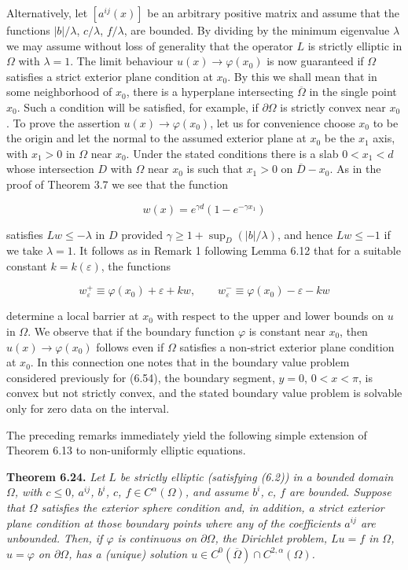 Alternatively, let $[a^{ij}(x)]$ be an arbitrary positive matrix and assume that the functions $\lvert b\rvert/\lambda$, $c/\lambda$, $f/\lambda$, are bounded. By dividing by the minimum eigenvalue $\lambda$ we may assume without loss of generality that the operator $L$ is strictly elliptic in $\Omega$ with $\lambda=1$. The limit behaviour $u(x)\to \varphi(x_0)$ is now guaranteed if $\Omega$ satisfies a strict exterior plane condition at $x_0$. By this we shall mean that in some neighborhood of $x_0$, there is a hyperplane intersecting $\overline{\Omega}$ in the single point $x_0$. Such a condition will be satisfied, for example, if $\partial\Omega$ is strictly convex near $x_0$. To prove the assertion $u(x)\to \varphi(x_0)$, let us for convenience choose $x_0$ to be the origin and let the normal to the assumed exterior plane at $x_0$ be the $x_1$ axis, with $x_1>0$ in $\Omega$ near $x_0$. Under the stated conditions there is a slab $0<x_1<d$ whose intersection $D$ with $\Omega$ near $x_0$ is such that $x_1>0$ on $\overline{D}-x_0$. As in the proof of Theorem 3.7 we see that the function

\[
w(x)=e^{\gamma d}(1-e^{-\gamma x_1})
\]

satisfies $Lw\le -\lambda$ in $D$ provided $\gamma\ge 1+\sup_D(\lvert b\rvert/\lambda)$, and hence $Lw\le -1$ if we take $\lambda=1$. It follows as in Remark 1 following Lemma 6.12 that for a suitable constant $k=k(\varepsilon)$, the functions

\[
w_\varepsilon^+\equiv \varphi(x_0)+\varepsilon+kw,\qquad
w_\varepsilon^-\equiv \varphi(x_0)-\varepsilon-kw
\]


determine a local barrier at $x_0$ with respect to the upper and lower bounds on $u$ in $\Omega$.
We observe that if the boundary function $\varphi$ is constant near $x_0$, then $u(x)\to \varphi(x_0)$ follows even if $\Omega$ satisfies a non-strict exterior plane condition at $x_0$. In this connection one notes that in the boundary value problem considered previously for (6.54), the boundary segment, $y=0$, $0<x<\pi$, is convex but not strictly convex, and the stated boundary value problem is solvable only for zero data on the interval.

The preceding remarks immediately yield the following simple extension of Theorem 6.13 to non-uniformly elliptic equations.

\medskip

\noindent\textbf{Theorem 6.24.} \textit{Let $L$ be strictly elliptic (satisfying (6.2)) in a bounded domain $\Omega$, with $c\leq 0$, $a^{ij}$, $b^i$, $c$, $f\in C^\alpha(\Omega)$, and assume $b^i$, $c$, $f$ are bounded. Suppose that $\Omega$ satisfies the exterior sphere condition and, in addition, a strict exterior plane condition at those boundary points where any of the coefficients $a^{ij}$ are unbounded. Then, if $\varphi$ is continuous on $\partial\Omega$, the Dirichlet problem, $Lu=f$ in $\Omega$, $u=\varphi$ on $\partial\Omega$, has a (unique) solution $u\in C^0(\overline{\Omega})\cap C^{2,\alpha}(\Omega)$.}

